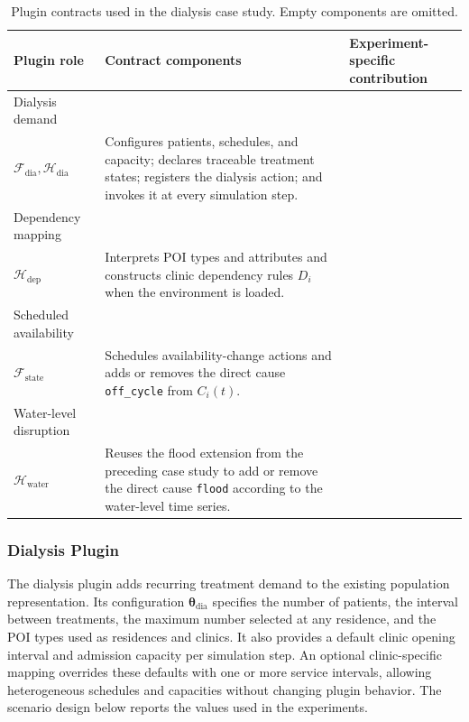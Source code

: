 \begin{table}[htbp]
    \centering
    \small
    \caption{Plugin contracts used in the dialysis case study. Empty components are omitted.}
    \label{tbl:dialysis_plugin_contracts}
    \begin{tabularx}{\textwidth}{>{\raggedright\arraybackslash}p{}>{\raggedright\arraybackslash}p{}X}
        \toprule
        \textbf{Plugin role} & \textbf{Contract components} & \textbf{Experiment-specific contribution} \\
        \midrule
        Dialysis demand & \shortstack[l]{$\bm{\theta}_{\mathrm{dia}},E_{\mathrm{dia}},$\\$\mathcal{F}_{\mathrm{dia}},\mathcal{H}_{\mathrm{dia}}$} & Configures patients, schedules, and capacity; declares traceable treatment states; registers the dialysis action; and invokes it at every simulation step. \\
        Dependency mapping & \shortstack[l]{$\bm{\theta}_{\mathrm{dep}},E_{\mathrm{dep}},$\\$\mathcal{H}_{\mathrm{dep}}$} & Interprets POI types and attributes and constructs clinic dependency rules $D_i$ when the environment is loaded. \\
        Scheduled availability & \shortstack[l]{$\bm{\theta}_{\mathrm{state}},\mathcal{R}_{\mathrm{state}},$\\$\mathcal{F}_{\mathrm{state}}$} & Schedules availability-change actions and adds or removes the direct cause \texttt{off\_cycle} from $C_i(t)$. \\
        Water-level disruption & \shortstack[l]{$\bm{\theta}_{\mathrm{water}},E_{\mathrm{water}},$\\$\mathcal{H}_{\mathrm{water}}$} & Reuses the flood extension from the preceding case study to add or remove the direct cause \texttt{flood} according to the water-level time series. \\
        \bottomrule
    \end{tabularx}
\end{table}

\FloatBarrier

\subsubsection{Dialysis Plugin}

The dialysis plugin adds recurring treatment demand to the existing population representation. Its configuration $\bm{\theta}_{\mathrm{dia}}$ specifies the number of patients, the interval between treatments, the maximum number selected at any residence, and the POI types used as residences and clinics. It also provides a default clinic opening interval and admission capacity per simulation step. An optional clinic-specific mapping overrides these defaults with one or more service intervals, allowing heterogeneous schedules and capacities without changing plugin behavior. The scenario design below reports the values used in the experiments.

